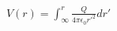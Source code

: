 \documentclass[preview]{standalone}
\begin{document}
\begin{align*}
V(r) = \int_{\infty}^{r} \frac{Q}{4\pi \epsilon_0 r'^2} dr'
\end{align*}
\end{document}
